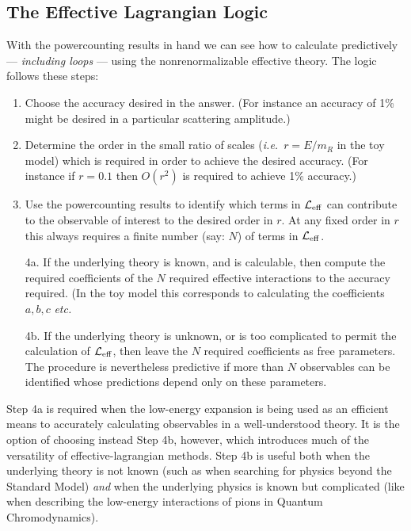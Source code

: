 \documentclass[12pt]{article}
\def\sst{\scriptscriptstyle}
\def\ie{{\it i.e.}}
\begin{document}
\subsection{The Effective Lagrangian Logic}

With the powercounting results in hand we can see how
to calculate predictively --- {\it including loops} --- using 
the nonrenormalizable effective theory. The logic follows
these steps:

\begin{enumerate}
\item %
Choose the accuracy desired in the answer. (For instance
an accuracy of 1\% might be desired in a particular scattering
amplitude.)
%
\item %
Determine the order in the small ratio of scales (\ie\
$r = E/m_{\sst R}$ in the toy model) which
is required in order to achieve the desired accuracy. (For
instance if $r = 0.1$ then $O(r^2)$ is required to achieve
1\% accuracy.)
%
\item %
Use the powercounting results to identify which terms in
${\cal L}_{\rm eff}$ can contribute to the observable
of interest to the desired order in $r$. At any fixed order
in $r$ this always requires a finite number (say: $N$) of terms in
${\cal L}_{\rm eff}$.
%
\item[4a.] %
If the underlying theory is known, and is calculable, then
compute the required coefficients of the $N$ required
effective interactions to the accuracy required. (In the
toy model this corresponds to calculating the coefficients
$a,b,c$ {\it etc.}
%
\item[4b.] %
If the underlying theory is unknown, or is too complicated
to permit the calculation of ${\cal L}_{\rm eff}$, then
leave the $N$ required coefficients as free parameters.
The procedure is nevertheless predictive if more than
$N$ observables can be identified whose predictions 
depend only on these parameters. 

\end{enumerate}

Step 4a is required when the low-energy expansion
is being used as an efficient means to accurately
calculating observables in a well-understood theory.
It is the option of choosing instead
Step 4b, however, which introduces much of
the versatility of effective-lagrangian methods. Step
4b is useful both when the underlying theory is not known
(such as when searching for physics beyond the 
Standard Model) {\it and} when the underlying physics
is known but complicated (like when describing the
low-energy interactions of pions in Quantum Chromodynamics).
\end{document}
